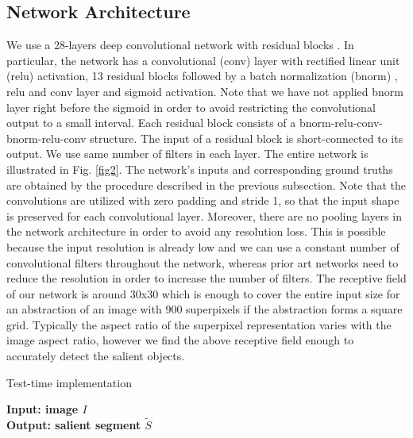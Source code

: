 \documentclass[a4paper,conference]{IEEEtran}
\begin{document}
\subsection{Network Architecture}
We use a 28-layers deep convolutional network with residual blocks \cite{He}.
In particular, the network has a convolutional (conv) layer with rectified linear unit \cite{Nair} (relu) activation, 13 residual blocks followed by a batch normalization \cite{Ioffe} (bnorm) , relu and conv layer and sigmoid activation.
Note that we have not applied bnorm layer right before the sigmoid in order to avoid restricting the convolutional output to a small interval.
Each residual block consists of a bnorm-relu-conv-bnorm-relu-conv structure.
The input of a residual block is short-connected to its output.
We use same number of filters in each layer.
The entire network is illustrated in Fig. \ref{fig2}.
The network's inputs and corresponding ground truths are obtained by the procedure described in the previous subsection.
Note that the convolutions are utilized with zero padding and stride 1, so that the input shape is preserved for each convolutional layer.
Moreover, there are no pooling layers in the network architecture in order to avoid any resolution loss.
This is possible because the input resolution is already low and we can use a constant number of convolutional filters throughout the network, whereas prior art networks need to reduce the resolution in order to increase the number of filters.
The receptive field of our network is around 30x30 which is enough to cover the entire input size for an abstraction of an image with 900 superpixels if the abstraction forms a square grid.
Typically the aspect ratio of the superpixel representation varies with the image aspect ratio, however we find the above receptive field enough to accurately detect the salient objects.


\begin{algorithm}
\caption{Test-time implementation}\label{testalgorithm}
\hspace*{\algorithmicindent} \textbf{Input: image $ I $} \\
\hspace*{\algorithmicindent} \textbf{Output: salient segment $ \tilde{S} $ }
\begin{algorithmic}[1] \\
 \\
 \\
 \\
\end{algorithmic}
\end{algorithm}
\end{document}
